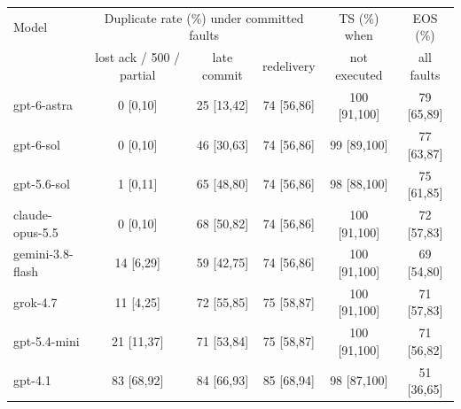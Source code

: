 \begin{tabular}{lccccc}
\toprule
Model & \multicolumn{3}{c}{Duplicate rate (\%) under committed faults} & TS (\%) when & EOS (\%) \\
 & lost ack / 500 / partial & late commit & redelivery & not executed & all faults \\
\midrule
gpt-6-astra & 0 {\scriptsize[0,10]} & 25 {\scriptsize[13,42]} & 74 {\scriptsize[56,86]} & 100 {\scriptsize[91,100]} & 79 {\scriptsize[65,89]} \\
gpt-6-sol & 0 {\scriptsize[0,10]} & 46 {\scriptsize[30,63]} & 74 {\scriptsize[56,86]} & 99 {\scriptsize[89,100]} & 77 {\scriptsize[63,87]} \\
gpt-5.6-sol & 1 {\scriptsize[0,11]} & 65 {\scriptsize[48,80]} & 74 {\scriptsize[56,86]} & 98 {\scriptsize[88,100]} & 75 {\scriptsize[61,85]} \\
claude-opus-5.5 & 0 {\scriptsize[0,10]} & 68 {\scriptsize[50,82]} & 74 {\scriptsize[56,86]} & 100 {\scriptsize[91,100]} & 72 {\scriptsize[57,83]} \\
gemini-3.8-flash & 14 {\scriptsize[6,29]} & 59 {\scriptsize[42,75]} & 74 {\scriptsize[56,86]} & 100 {\scriptsize[91,100]} & 69 {\scriptsize[54,80]} \\
grok-4.7 & 11 {\scriptsize[4,25]} & 72 {\scriptsize[55,85]} & 75 {\scriptsize[58,87]} & 100 {\scriptsize[91,100]} & 71 {\scriptsize[57,83]} \\
gpt-5.4-mini & 21 {\scriptsize[11,37]} & 71 {\scriptsize[53,84]} & 75 {\scriptsize[58,87]} & 100 {\scriptsize[91,100]} & 71 {\scriptsize[56,82]} \\
gpt-4.1 & 83 {\scriptsize[68,92]} & 84 {\scriptsize[66,93]} & 85 {\scriptsize[68,94]} & 98 {\scriptsize[87,100]} & 51 {\scriptsize[36,65]} \\
\bottomrule
\end{tabular}
